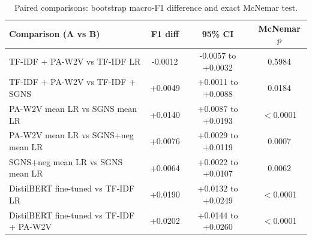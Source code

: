 \begin{table}[H]
\centering
\footnotesize
\caption{Paired comparisons: bootstrap macro-F1 difference and exact McNemar test.}
\label{tab:senttest}
\begin{tabular}{p{6.4cm}ccc}
\toprule
Comparison (A vs B) & F1 diff & 95\% CI & McNemar $p$ \\
\midrule
TF-IDF + PA-W2V vs TF-IDF LR & -0.0012 & -0.0057 to +0.0032 & 0.5984 \\
TF-IDF + PA-W2V vs TF-IDF + SGNS & +0.0049 & +0.0011 to +0.0088 & 0.0184 \\
PA-W2V mean LR vs SGNS mean LR & +0.0140 & +0.0087 to +0.0193 & $<$0.0001 \\
PA-W2V mean LR vs SGNS+neg mean LR & +0.0076 & +0.0029 to +0.0119 & 0.0007 \\
SGNS+neg mean LR vs SGNS mean LR & +0.0064 & +0.0022 to +0.0107 & 0.0062 \\
DistilBERT fine-tuned vs TF-IDF LR & +0.0190 & +0.0132 to +0.0249 & $<$0.0001 \\
DistilBERT fine-tuned vs TF-IDF + PA-W2V & +0.0202 & +0.0144 to +0.0260 & $<$0.0001 \\
\bottomrule
\end{tabular}
\end{table}